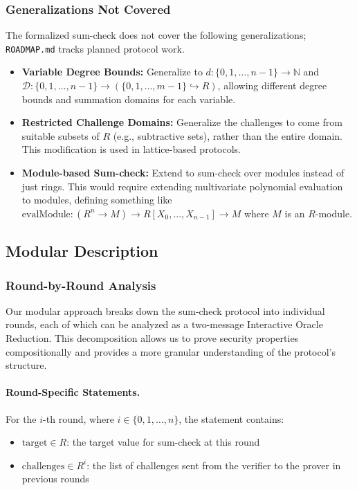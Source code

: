 \subsubsection{Generalizations Not Covered}

The formalized sum-check does not cover the following generalizations; \texttt{ROADMAP.md} tracks
planned protocol work.

\begin{itemize}
    \item \textbf{Variable Degree Bounds:} Generalize to $d : \{0, 1, \ldots, n-1\} \to \mathbb{N}$ and $\mathcal{D} : \{0, 1, \ldots, n-1\} \to (\{0, 1, \ldots, m-1\} \hookrightarrow R)$, allowing different degree bounds and summation domains for each variable.

    \item \textbf{Restricted Challenge Domains:} Generalize the challenges to come from suitable subsets of $R$ (e.g., subtractive sets), rather than the entire domain. This modification is used in lattice-based protocols.

    \item \textbf{Module-based Sum-check:} Extend to sum-check over modules instead of just rings. This would require extending multivariate polynomial evaluation to modules, defining something like $\text{evalModule} : (R^n \to M) \to R[X_0, \ldots, X_{n-1}] \to M$ where $M$ is an $R$-module.
\end{itemize}

\subsection{Modular Description}\label{sec:sumcheck_modular}

\subsubsection{Round-by-Round Analysis}

Our modular approach breaks down the sum-check protocol into individual rounds, each of which can be analyzed as a two-message Interactive Oracle Reduction. This decomposition allows us to prove security properties compositionally and provides a more granular understanding of the protocol's structure.

\paragraph{Round-Specific Statements.} For the $i$-th round, where $i \in \{0, 1, \ldots, n\}$, the statement contains:
\begin{itemize}
    \item $\text{target} \in R$: the target value for sum-check at this round
    \item $\text{challenges} \in R^i$: the list of challenges sent from the verifier to the prover in previous rounds
\end{itemize}

